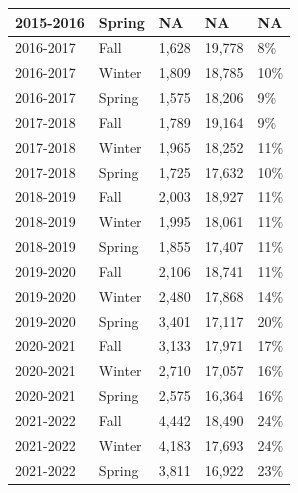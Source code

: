 \documentclass[10]{article}
\begin{document}
\begin{longtable}[c]{|l|l|l|l|l|}
	2015-2016              & Spring        & NA             & NA                  & NA                  \\ \hline
	2016-2017              & Fall          & 1,628          & 19,778              & 8\%                 \\ \hline
	2016-2017              & Winter        & 1,809          & 18,785              & 10\%                \\ \hline
	2016-2017              & Spring        & 1,575          & 18,206              & 9\%                 \\ \hline
	2017-2018              & Fall          & 1,789          & 19,164              & 9\%                 \\ \hline
	2017-2018              & Winter        & 1,965          & 18,252              & 11\%                \\ \hline
	2017-2018              & Spring        & 1,725          & 17,632              & 10\%                \\ \hline
	2018-2019              & Fall          & 2,003          & 18,927              & 11\%                \\ \hline
	2018-2019              & Winter        & 1,995          & 18,061              & 11\%                \\ \hline
	2018-2019              & Spring        & 1,855          & 17,407              & 11\%                \\ \hline
	2019-2020              & Fall          & 2,106          & 18,741              & 11\%                \\ \hline
	2019-2020              & Winter        & 2,480          & 17,868              & 14\%                \\ \hline
	2019-2020              & Spring        & 3,401          & 17,117              & 20\%                \\ \hline
	2020-2021              & Fall          & 3,133          & 17,971              & 17\%                \\ \hline
	2020-2021              & Winter        & 2,710          & 17,057              & 16\%                \\ \hline
	2020-2021              & Spring        & 2,575          & 16,364              & 16\%                \\ \hline
	2021-2022              & Fall          & 4,442          & 18,490              & 24\%                \\ \hline
	2021-2022              & Winter        & 4,183          & 17,693              & 24\%                \\ \hline
	2021-2022              & Spring        & 3,811          & 16,922              & 23\%                \\ \hline
\end{longtable}
\end{document}
